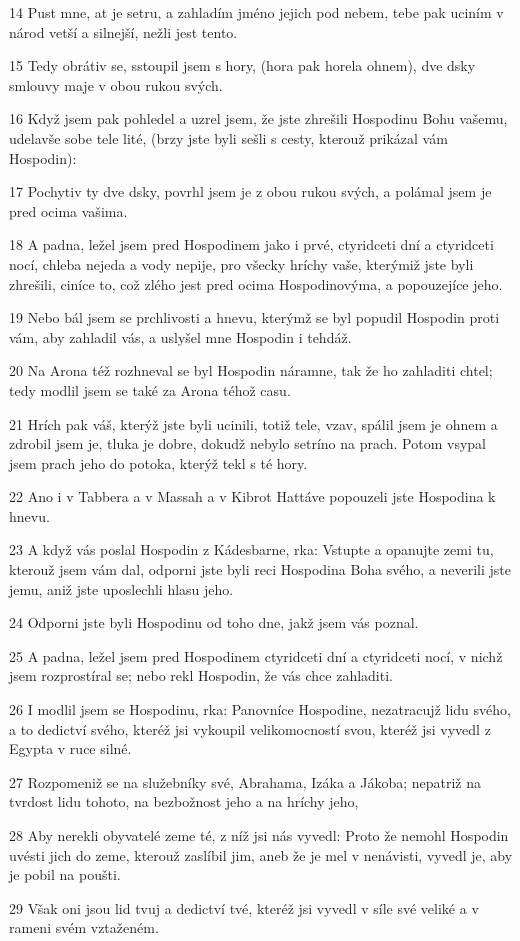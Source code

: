 \par 14 Pust mne, at je setru, a zahladím jméno jejich pod nebem, tebe pak uciním v národ vetší a silnejší, nežli jest tento.
\par 15 Tedy obrátiv se, sstoupil jsem s hory, (hora pak horela ohnem), dve dsky smlouvy maje v obou rukou svých.
\par 16 Když jsem pak pohledel a uzrel jsem, že jste zhrešili Hospodinu Bohu vašemu, udelavše sobe tele lité, (brzy jste byli sešli s cesty, kterouž prikázal vám Hospodin):
\par 17 Pochytiv ty dve dsky, povrhl jsem je z obou rukou svých, a polámal jsem je pred ocima vašima.
\par 18 A padna, ležel jsem pred Hospodinem jako i prvé, ctyridceti dní a ctyridceti nocí, chleba nejeda a vody nepije, pro všecky hríchy vaše, kterýmiž jste byli zhrešili, ciníce to, což zlého jest pred ocima Hospodinovýma, a popouzejíce jeho.
\par 19 Nebo bál jsem se prchlivosti a hnevu, kterýmž se byl popudil Hospodin proti vám, aby zahladil vás, a uslyšel mne Hospodin i tehdáž.
\par 20 Na Arona též rozhneval se byl Hospodin náramne, tak že ho zahladiti chtel; tedy modlil jsem se také za Arona téhož casu.
\par 21 Hrích pak váš, kterýž jste byli ucinili, totiž tele, vzav, spálil jsem je ohnem a zdrobil jsem je, tluka je dobre, dokudž nebylo setríno na prach. Potom vsypal jsem prach jeho do potoka, kterýž tekl s té hory.
\par 22 Ano i v Tabbera a v Massah a v Kibrot Hattáve popouzeli jste Hospodina k hnevu.
\par 23 A když vás poslal Hospodin z Kádesbarne, rka: Vstupte a opanujte zemi tu, kterouž jsem vám dal, odporni jste byli reci Hospodina Boha svého, a neverili jste jemu, aniž jste uposlechli hlasu jeho.
\par 24 Odporni jste byli Hospodinu od toho dne, jakž jsem vás poznal.
\par 25 A padna, ležel jsem pred Hospodinem ctyridceti dní a ctyridceti nocí, v nichž jsem rozprostíral se; nebo rekl Hospodin, že vás chce zahladiti.
\par 26 I modlil jsem se Hospodinu, rka: Panovníce Hospodine, nezatracujž lidu svého, a to dedictví svého, kteréž jsi vykoupil velikomocností svou, kteréž jsi vyvedl z Egypta v ruce silné.
\par 27 Rozpomeniž se na služebníky své, Abrahama, Izáka a Jákoba; nepatriž na tvrdost lidu tohoto, na bezbožnost jeho a na hríchy jeho,
\par 28 Aby nerekli obyvatelé zeme té, z níž jsi nás vyvedl: Proto že nemohl Hospodin uvésti jich do zeme, kterouž zaslíbil jim, aneb že je mel v nenávisti, vyvedl je, aby je pobil na poušti.
\par 29 Však oni jsou lid tvuj a dedictví tvé, kteréž jsi vyvedl v síle své veliké a v rameni svém vztaženém.

